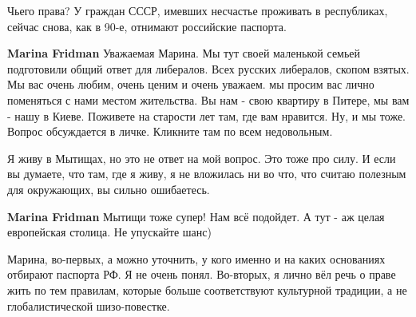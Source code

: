 \begin{itemize}
\begin{itemize}
Чьего права? У граждан СССР, имевших несчастье проживать в республиках, сейчас снова, как в 90-е, отнимают российские паспорта.

 
\textbf{Marina Fridman} Уважаемая Марина. Мы тут своей маленькой семьей
подготовили общий ответ для либералов. Всех русских либералов, скопом взятых.
Мы вас очень любим, очень ценим и очень уважаем. мы просим вас лично поменяться
с нами местом жительства. Вы нам - свою квартиру в Питере, мы вам - нашу в
Киеве. Поживете на старости лет там, где вам нравится. Ну, и мы тоже. Вопрос
обсуждается в личке. Кликните там по всем недовольным.

 
Я живу в Мытищах, но это не ответ на мой вопрос. Это тоже про силу. И если вы думаете, что там, где я живу, я не вложилась ни во что, что считаю полезным для окружающих, вы сильно ошибаетесь.

 
\textbf{Marina Fridman} Мытищи тоже супер! Нам всё подойдет. А тут - аж целая европейская столица. Не упускайте шанс)

 

Марина, во-первых, а можно уточнить, у кого именно и на каких основаниях
отбирают паспорта РФ. Я не очень понял. Во-вторых, я лично вёл речь о праве
жить по тем правилам, которые больше соответствуют культурной традиции, а не
глобалистической шизо-повестке.

 

\end{itemize}
\end{itemize}
